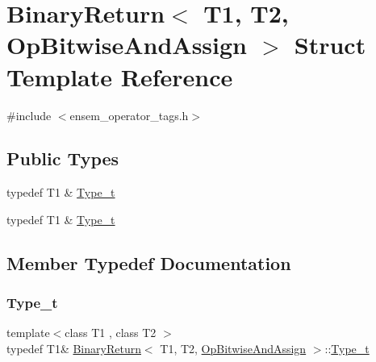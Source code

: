 \hypertarget{structBinaryReturn_3_01T1_00_01T2_00_01OpBitwiseAndAssign_01_4}{}\section{Binary\+Return$<$ T1, T2, Op\+Bitwise\+And\+Assign $>$ Struct Template Reference}
\label{structBinaryReturn_3_01T1_00_01T2_00_01OpBitwiseAndAssign_01_4}


{\ttfamily \#include $<$ensem\+\_\+operator\+\_\+tags.\+h$>$}

\subsection*{Public Types}
\begin{DoxyCompactItemize}
\item 
typedef T1 \& \mbox{\hyperlink{structBinaryReturn_3_01T1_00_01T2_00_01OpBitwiseAndAssign_01_4_af047665bd1eeb8cd1c5b11049e4652a7}{Type\+\_\+t}}
\item 
typedef T1 \& \mbox{\hyperlink{structBinaryReturn_3_01T1_00_01T2_00_01OpBitwiseAndAssign_01_4_af047665bd1eeb8cd1c5b11049e4652a7}{Type\+\_\+t}}
\end{DoxyCompactItemize}


\subsection{Member Typedef Documentation}
\mbox{\label{structBinaryReturn_3_01T1_00_01T2_00_01OpBitwiseAndAssign_01_4_af047665bd1eeb8cd1c5b11049e4652a7}} 
\subsubsection{\texorpdfstring{Type\_t}{Type\_t}\hspace{0.1cm}{\footnotesize\ttfamily [1/2]}}
{\footnotesize\ttfamily template$<$class T1 , class T2 $>$ \\
typedef T1\& \mbox{\hyperlink{structBinaryReturn}{Binary\+Return}}$<$ T1, T2, \mbox{\hyperlink{structOpBitwiseAndAssign}{Op\+Bitwise\+And\+Assign}} $>$\+::\mbox{\hyperlink{structBinaryReturn_3_01T1_00_01T2_00_01OpBitwiseAndAssign_01_4_af047665bd1eeb8cd1c5b11049e4652a7}{Type\+\_\+t}}}

